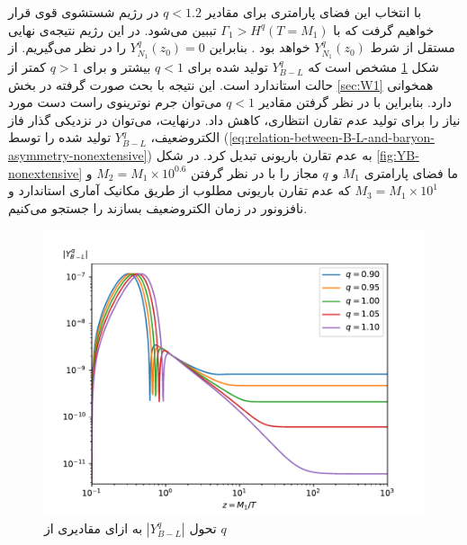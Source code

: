 \documentclass[a4paper]{book}
\begin{document}
با انتخاب این فضای پارامتری برای مقادیر {\footnotesize$q<1.2$} در رژیم شستشوی قوی قرار خواهیم گرفت که با {\footnotesize$\Gamma_1 > H^q(T = M_1)$} تببین می‌شود. در این رژیم نتیجه‌ی نهایی مستقل از شرط {\footnotesize$Y^q_{N_1}(z_0)$} خواهد بود \cite{Buchmuller:2004nz}.
بنابراین {\footnotesize$Y_{N_1}^q(z_0)=0$} را در نظر می‌گیریم. از شکل \ref{fig:YBL-nonextensive} مشخص است که {\footnotesize$Y^q_{B-L}$} تولید شده برای {\footnotesize$q<1$} بیشتر و برای {\footnotesize$q>1$} کمتر از حالت استاندارد است. این نتیجه با بحث صورت گرفته در بخش \ref{sec:W1} همخوانی دارد. 
بنابراین با در نظر گرفتن مقادیر {\footnotesize$q<1$} می‌توان جرم نوترینوی راست دست مورد نیاز را برای تولید عدم تقارن انتظاری، کاهش داد. درنهایت، می‌توان در نزدیکی گذار فاز الکتروضعیف، {\footnotesize$Y^q_{B-L}$} تولید شده را توسط (\ref{eq:relation-between-B-L-and-baryon-asymmetry-nonextensive}) به عدم تقارن باریونی تبدیل کرد.
در شکل \ref{fig:YB-nonextensive} ما فضای پارامتری {\footnotesize$M_1$} و {\footnotesize$q$} مجاز را با در نظر گرفتن {\footnotesize$M_2=M_1 \times 10^{0.6}$} و {\footnotesize$M_3=M_1 \times 10^{1}$} که عدم تقارن باریونی مطلوب از طریق مکانیک آماری استاندارد و نافزونور در زمان الکتروضعیف بسازند را جستجو می‌کنیم.
\begin{figure}[!h]
\centering
\includegraphics[width=13cm]{fig-BL-nonextensive.pdf}
	\caption{تحول {\footnotesize$|Y^q_{B-L}|$} به ازای مقادیری از {\footnotesize$q$} \label{fig:YBL-nonextensive}}
\end{figure}
\end{document}
